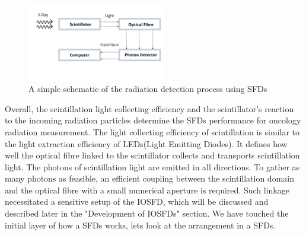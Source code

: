 \documentclass{article}
\begin{document}
\begin{multicols}{2}
\begin{figure}[H]
    \centering
    \includegraphics[width=6cm]{images/Fig1_Schematic.png}
    \caption{A simple schematic of the radiation detection process using SFDs}
    \label{fig:1}
\end{figure}

Overall, the scintillation light collecting efficiency and the scintillator's reaction to the incoming radiation particles determine the SFDs performance for oncology radiation measurement. The light collecting efficiency of scintillation is similar to the light extraction efficiency of LEDs(Light Emitting Diodes). It defines how well the optical fibre linked to the scintillator collects and transports scintillation light. The photons of scintillation light are emitted in all directions\cite{ashraf2020dosimetry}. To gather as many photons as feasible, an efficient coupling between the scintillation domain and the optical fibre with a small numerical aperture is required. Such linkage necessitated a sensitive setup of the IOSFD, which will be discussed and described later in the "Development of IOSFDs" section. We have touched the initial layer of how a SFDs works, lets look at the arrangement in a SFDs. 

\end{multicols}
\end{document}
